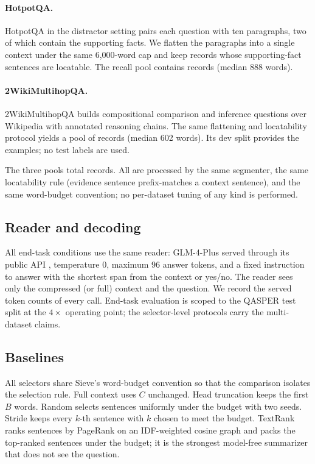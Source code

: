 \documentclass[preprint,12pt]{elsarticle}
\theoremstyle{remark}
\newcommand{\method}{Sieve}
\begin{document}
\paragraph{HotpotQA.}
HotpotQA \citep{yang2018hotpotqa} in the distractor setting pairs each
question with ten paragraphs, two of which contain the supporting
facts. We flatten the paragraphs into a single context under the same
6{,}000-word cap and keep records whose supporting-fact sentences are
locatable. The recall pool contains \NRecH{} records (median 888
words).

\paragraph{2WikiMultihopQA.}
2WikiMultihopQA \citep{ho2020wiki} builds compositional comparison and
inference questions over Wikipedia with annotated reasoning chains.
The same flattening and locatability protocol yields a pool of
\NRecW{} records (median 602 words). Its dev split provides the
examples; no test labels are used.

The three pools total \TotalRecords{} records. All are processed by
the same segmenter, the same locatability rule (evidence sentence
prefix-matches a context sentence), and the same word-budget
convention; no per-dataset tuning of any kind is performed.

\subsection{Reader and decoding}
All end-task conditions use the same reader: GLM-4-Plus served through
its public API \citep{glm2024chatglm}, temperature $0$, maximum 96
answer tokens, and a fixed instruction to answer with the shortest
span from the context or yes/no. The reader sees only the compressed
(or full) context and the question. We record the served token counts
of every call. End-task evaluation is scoped to the QASPER test split
at the $4\times$ operating point; the selector-level protocols carry
the multi-dataset claims.

\subsection{Baselines}
\label{sec:baselines}
All selectors share \method{}'s word-budget convention so that the
comparison isolates the selection rule. Full context uses $C$
unchanged. Head truncation keeps the first $B$ words. Random selects
sentences uniformly under the budget with two seeds. Stride keeps
every $k$-th sentence with $k$ chosen to meet the budget. TextRank
\citep{mihalcea2004textrank} ranks sentences by PageRank on an
IDF-weighted cosine graph and packs the top-ranked sentences under the
budget; it is the strongest model-free summarizer that does not see
the question.
\end{document}
